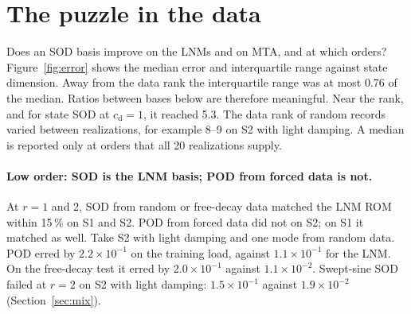 \documentclass[preprint,12pt]{elsarticle}
\begin{document}
\begin{table}[t]
\centering\small
\caption{Simulation settings. Random seeds, scripts and run times are listed in the reproduction manual (\ref{app:repro}).}
\label{tab:repro}
\end{table}
\section{The puzzle in the data}\label{sec:acc}
Does an SOD basis improve on the LNMs and on MTA, and at which orders?
Figure~\ref{fig:error} shows the median error and interquartile range against state dimension.
Away from the data rank the interquartile range was at most 0.76 of the median. Ratios between bases below are therefore meaningful. Near the rank, and for state SOD at $c_{\mathrm d}=1$, it reached 5.3.
The data rank of random records varied between realizations, for example 8--9 on S2 with light damping. A median is reported only at orders that all 20 realizations supply.

\paragraph{Low order: SOD is the LNM basis; POD from forced data is not.} At $r=1$ and 2, SOD from random or free-decay data matched the LNM ROM within 15\,\% on S1 and S2.
POD from forced data did not on S2; on S1 it matched as well. Take S2 with light damping and one mode from random data. POD erred by $2.2\times10^{-1}$ on the training load, against $1.1\times10^{-1}$ for the LNM. On the free-decay test it erred by $2.0\times10^{-1}$ against $1.1\times10^{-2}$.
Swept-sine SOD failed at $r=2$ on S2 with light damping: $1.5\times10^{-1}$ against $1.9\times10^{-2}$ (Section~\ref{sec:mix}).
\end{document}
